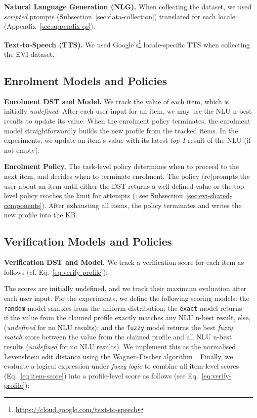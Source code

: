 \documentclass[11pt]{article}
\newcommand{\sparagraph}[1]{\noindent\textbf{#1.}}
\newcommand{\rparagraph}[1]{\vspace{1.4mm}\noindent\textbf{#1.}}
\begin{document}
{\rparagraph{Natural Language Generation (NLG)}
When collecting the dataset,
we used \textit{scripted} prompts (Subsection~\ref{sec:data-collection})
translated for each locale (Appendix~\ref{sec:appendix-qs}).

\rparagraph{Text-to-Speech (TTS)}
We used Google's\footnote{\url{https://cloud.google.com/text-to-speech}}
locale-specific TTS when collecting the EVI dataset.




\subsection{Enrolment Models and Policies}
\label{sec:enrolment-policy}


\sparagraph{Enrolment DST and Model}
We track the value of each item, which is initially \textit{undefined}.
After each user input for an item,
we may use the NLU n-best results to update its value.
When the enrolment policy terminates,
the enrolment model straightforwardly builds 
the new profile from the tracked items.
In the experiments,
we update an item's value
with its latest \textit{top-1} result of the NLU (if not empty).

\rparagraph{Enrolment Policy}
The task-level policy
determines when to proceed to the next item,
and decides when to terminate enrolment.
The policy
(re)prompts the user about an item
until
either the DST returns a well-defined value or the top-level policy reaches the limit for attempts
(; see Subsection~\ref{sec:evi-shared-components}).
After exhausting all items, the policy terminates
and writes the new profile into the KB.



\subsection{Verification Models and Policies}
\label{sec:verification-policy}

\sparagraph{Verification DST and Model}
We track a verification score for each item  as follows (cf. Eq.~\ref{eq:verify-profile}):

\vspace{-2mm}
{\small
}The scores are initially undefined,
and we track their maximum evaluation after each user input.
For the experiments,
we define the following scoring models:
the \texttt{random} model samples from the  uniform distribution;
the \texttt{exact} model
returns ~ 
if the value from the claimed profile
exactly matches any NLU n-best result, else,  (\textit{undefined} for no NLU results);
and the \texttt{fuzzy} model
returns the best \textit{fuzzy match} score
between the value from the claimed profile
and all NLU n-best results (\textit{undefined} for no NLU results).
We implement this as the normalised Levenshtein edit distance
using the Wagner–Fischer algorithm~\cite{wagner1974string}.
Finally, we evaluate a logical expression under \textit{fuzzy logic}
to combine all item-level scores (Eq.~\ref{eq:item-score})
into a profile-level score as follows (see Eq.~\ref{eq:verify-profile}):

}
\end{document}
